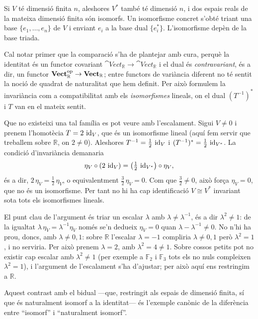 \begin{solucio}
Si $V$ té dimensió finita $n$, aleshores $V^*$ també té dimensió $n$, i dos espais reals de la mateixa dimensió finita són isomorfs. Un isomorfisme concret s'obté triant una base $\{e_1,\dots,e_n\}$ de $V$ i enviant $e_i$ a la base dual $\{e_i^*\}$. L'isomorfisme depèn de la base triada.

Cal notar primer que la comparació s'ha de plantejar amb cura, perquè la identitat és un functor covariant $\cat{Vect}_{\mathbb R}\to\cat{Vect}_{\mathbb R}$ i el dual és \emph{contravariant}, és a dir, un functor $\mathbf{Vect}_{\mathbb R}^{\mathrm{op}}\to\mathbf{Vect}_{\mathbb R}$; entre functors de variància diferent no té sentit la noció de quadrat de naturalitat que hem definit. Per això formulem la invariància com a compatibilitat amb els \emph{isomorfismes} lineals, on el dual $(T^{-1})^*$ i $T$ van en el mateix sentit.

Que no existeixi una tal família es pot veure amb l'escalament. Sigui $V\neq 0$ i prenem l'homotècia $T=2\,\operatorname{id}_V$, que és un isomorfisme lineal (aquí fem servir que treballem sobre $\mathbb R$, on $2\neq 0$). Aleshores $T^{-1}=\tfrac12\,\operatorname{id}_V$ i $(T^{-1})^*=\tfrac12\,\operatorname{id}_{V^*}$. La condició d'invariància demanaria
\[
\eta_V\circ(2\,\operatorname{id}_V)=\bigl(\tfrac12\,\operatorname{id}_{V^*}\bigr)\circ\eta_V,
\]
és a dir, $2\,\eta_V=\tfrac12\,\eta_V$, o equivalentment $\tfrac32\,\eta_V=0$. Com que $\tfrac32\neq 0$, això força $\eta_V=0$, que no és un isomorfisme. Per tant no hi ha cap identificació $V\cong V^*$ invariant sota tots els isomorfismes lineals.

\begin{observacio}
El punt clau de l'argument és triar un escalar $\lambda$ amb $\lambda\neq\lambda^{-1}$, és a dir $\lambda^2\neq 1$: de la igualtat $\lambda\,\eta_V=\lambda^{-1}\eta_V$ només se'n dedueix $\eta_V=0$ quan $\lambda-\lambda^{-1}\neq 0$. No n'hi ha prou, doncs, amb $\lambda\neq 0,1$: sobre $\mathbb R$ l'escalar $\lambda=-1$ compliria $\lambda\neq 0,1$ però $\lambda^2=1$, i no serviria. Per això prenem $\lambda=2$, amb $\lambda^2=4\neq 1$. Sobre cossos petits pot no existir cap escalar amb $\lambda^2\neq 1$ (per exemple a $\mathbb F_2$ i $\mathbb F_3$ tots els no nuls compleixen $\lambda^2=1$), i l'argument de l'escalament s'ha d'ajustar; per això aquí ens restringim a $\mathbb R$.
\end{observacio}

Aquest contrast amb el bidual ---que, restringit als espais de dimensió finita, sí que és naturalment isomorf a la identitat--- és l'exemple canònic de la diferència entre \enquote{isomorf} i \enquote{naturalment isomorf}.
\end{solucio}

